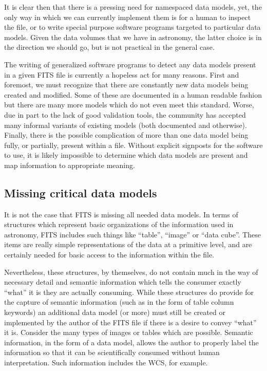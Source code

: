 \documentclass[final,authoryear,5p,times,twocolumn]{elsarticle}
\begin{document}
{{It is clear then that there is a pressing need for namespaced data models,
yet, the only way in which we can currently implement them is for a human
to inspect the file, or to write special purpose software programs targeted to
particular data models. Given the data volumes that we have in astronomy, the
latter choice is in the direction we should go, but is not practical
in the general case.


The writing of generalized software programs to detect any data models
present in a given FITS file is currently a hopeless act for many reasons.
First and foremost, we must recognize that there are constantly new data models
being created and modified. Some of these are documented in a human readable
fashion but there are many more models which do not even meet this standard.
Worse, due in part to the lack of good validation tools, the community has
accepted many informal variants of existing models (both documented and otherwise).
Finally, there is the possible complication of more than one data model being
fully, or partially, present within a file. Without explicit signposts for
the software to use, it is likely impossible to determine which data models
are present and map information to appropriate meaning.


\subsection{Missing critical data models}
\label{section_crit_data_models}


It is not the case that FITS is missing all needed data models. In
terms of structures which represent basic organizations of the
information used in astronomy, FITS includes such things like ``table'',
``image'' or ``data cube''. These items are really simple representations
of the data at a primitive level, and are certainly needed for basic
access to the information within the file.


Nevertheless, these structures, by themselves, do not contain much in
the way of necessary detail and semantic information which tells the
consumer exactly ``what'' it is they are actually consuming. While these
structures do provide for the capture of semantic information (such as
in the form of table column keywords) an additional data model (or
more) must still be created or implemented by the author of the FITS
file if there is a desire to convey ``what'' it is. Consider the many
types of images or tables which are possible. Semantic information, in
the form of a data model, allows the author to properly label the
information so that it can be scientifically consumed without human
interpretation. Such information includes the WCS, for example.


}}
\end{document}
